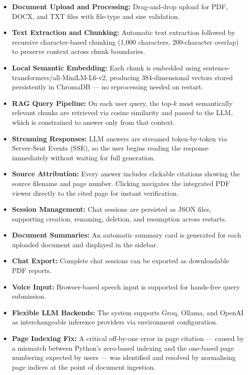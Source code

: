 \begin{itemize}
    \item \textbf{Document Upload and Processing:} Drag-and-drop upload for
    PDF, DOCX, and TXT files with file-type and size validation.

    \item \textbf{Text Extraction and Chunking:} Automatic text extraction
    followed by recursive character-based chunking (1{,}000 characters,
    200-character overlap) to preserve context across chunk boundaries.

    \item \textbf{Local Semantic Embedding:} Each chunk is embedded using
    sentence-transformers/all-MiniLM-L6-v2, producing 384-dimensional
    vectors stored persistently in ChromaDB --- no reprocessing needed on restart.

    \item \textbf{RAG Query Pipeline:} On each user query, the top-$k$ most
    semantically relevant chunks are retrieved via cosine similarity and passed
    to the LLM, which is constrained to answer only from that context.

    \item \textbf{Streaming Responses:} LLM answers are streamed token-by-token
    via Server-Sent Events (SSE), so the user begins reading the response
    immediately without waiting for full generation.

    \item \textbf{Source Attribution:} Every answer includes clickable citations
    showing the source filename and page number. Clicking navigates the integrated
    PDF viewer directly to the cited page for instant verification.

    \item \textbf{Session Management:} Chat sessions are persisted as JSON files,
    supporting creation, renaming, deletion, and resumption across restarts.

    \item \textbf{Document Summaries:} An automatic summary card is generated
    for each uploaded document and displayed in the sidebar.

    \item \textbf{Chat Export:} Complete chat sessions can be exported as
    downloadable PDF reports.

    \item \textbf{Voice Input:} Browser-based speech input is supported for
    hands-free query submission.

    \item \textbf{Flexible LLM Backends:} The system supports Groq, Ollama,
    and OpenAI as interchangeable inference providers via environment configuration.

    \item \textbf{Page Indexing Fix:} A critical off-by-one error in page
    citation --- caused by a mismatch between Python's zero-based indexing and
    the one-based page numbering expected by users --- was identified and resolved
    by normalising page indices at the point of document ingestion.
\end{itemize}

